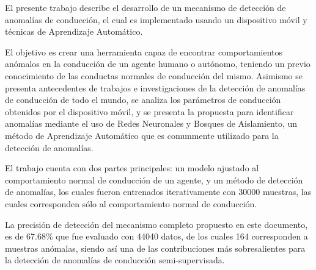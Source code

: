 \bigskip
El presente trabajo describe el desarrollo de un mecanismo de detecci\'{o}n de anomal\'{i}as de conducci\'{o}n, el cual es implementado usando un dispositivo m\'{o}vil y t\'{e}cnicas de Aprendizaje Autom\'{a}tico. 

El objetivo es crear una herramienta capaz de encontrar comportamientos an\'{o}malos en la conducci\'{o}n de un agente humano o aut\'{o}nomo, teniendo un previo conocimiento de las conductas normales de conducci\'{o}n del mismo. Asimismo se presenta antecedentes de trabajos e investigaciones de la detecci\'{o}n de anomal\'{i}as de conducci\'{o}n de todo el mundo, se analiza los par\'{a}metros de conducci\'{o}n obtenidos por el dispositivo m\'{o}vil, y se presenta la propuesta para identificar anomal\'{i}as mediante el uso de Redes Neuronales y Bosques de Aislamiento, un m\'{e}todo de Aprendizaje Autom\'{a}tico que es comunmente utilizado para la detecci\'{o}n de anomal\'{i}as.

El trabajo cuenta con dos partes principales: un modelo ajustado al comportamiento normal de conducci\'{o}n de un agente, y un m\'{e}todo de detecci\'{o}n de anomal\'{i}as, los cuales fueron entrenados iterativamente con 30000 muestras, las cuales corresponden s\'{o}lo al comportamiento normal de conducci\'{o}n.

La precisi\'{o}n de detecci\'{o}n del mecanismo completo propuesto en este documento, es de 67.68\% que fue evaluado con 44040 datos, de los cuales 164 corresponden a muestras an\'{o}malas, siendo as\'{i} una de las contribuciones m\'{a}s sobresalientes para la detecci\'{o}n de anomal\'{i}as de conducci\'{o}n semi-supervisada.


